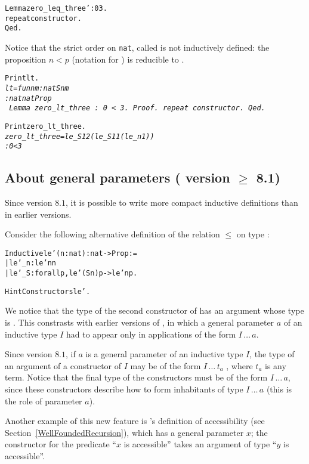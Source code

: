 \documentclass[11pt]{article}
\begin{document}
\begin{alltt}
Lemma zero_leq_three': 0 {\coqle} 3.
 repeat constructor.
Qed.
\end{alltt}

Notice that the strict order on \texttt{nat}, called 
is not inductively defined: the proposition $n<p$ (notation for )
is reducible to .

\begin{alltt}
Print lt.
\it
lt = fun n m : nat {\funarrow} S n {\coqle} m
     : nat {\arrow} nat {\arrow} Prop
\tt
Lemma zero_lt_three : 0 < 3.
Proof.
 repeat constructor. 
Qed.

Print zero_lt_three.
\it zero_lt_three = le_S 1 2 (le_S 1 1 (le_n 1))
     : 0 < 3
\end{alltt}



\subsection{About general parameters (\coq{} version $\geq$ 8.1)}
\label{parameterstuff}

Since version $8.1$, it is possible to write more compact inductive definitions
than in earlier versions.

Consider the following alternative definition of the relation $\leq$ on 
type :

\begin{alltt}
Inductive le'(n:nat):nat -> Prop :=
 | le'_n : le' n n
 | le'_S : forall p, le' (S n) p -> le' n p.

Hint Constructors le'.
\end{alltt}

We notice that the type of the second constructor of 
has an argument whose type is . 
This constrasts with earlier versions 
of {\coq}, in which a general parameter $a$ of an inductive
type $I$ had to appear only in applications of the form $I\,\dots\,a$.

Since version $8.1$, if $a$ is a general parameter of an inductive 
type $I$, the type of an argument of a constructor of $I$ may be
of the form  $I\,\dots\,t_a$ , where $t_a$ is any term.
Notice that the final type of the constructors must be of the form
$I\,\dots\,a$, since these constructors describe how to form 
inhabitants of type $I\,\dots\,a$ (this is the role of parameter $a$).

Another example of this new feature is {\coq}'s definition of accessibility
(see Section~\ref{WellFoundedRecursion}), which has a general parameter
$x$; the constructor for the predicate
``$x$ is accessible'' takes an  argument of type ``$y$ is accessible''.
\end{document}
